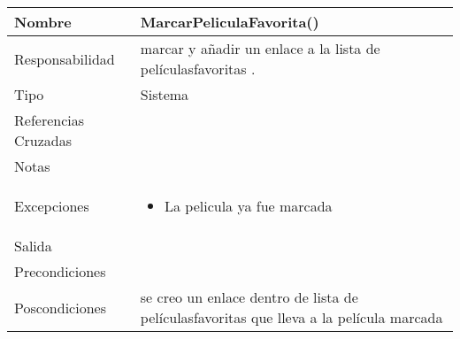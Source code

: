 \documentclass{article}
\begin{document}
\begin{table}[h]
\begin{tabular}{|l|l|l|l|l|l|}
\hline
\multicolumn{2}{|p{3cm}|}{Nombre} & \multicolumn{4}{p{10cm}|}{\textbf{MarcarPeliculaFavorita()}}\\
\hline
\multicolumn{2}{|p{3cm}|}{Responsabilidad} & \multicolumn{4}{p{10cm}|}{marcar y añadir un enlace a la lista de películasfavoritas .} \\
\hline
\multicolumn{2}{|p{3cm}|}{Tipo} & \multicolumn{4}{p{10cm}|}{Sistema} \\
\hline
\multicolumn{2}{|p{3cm}|}{Referencias Cruzadas} & \multicolumn{4}{p{10cm}|}{} \\
\hline
\multicolumn{2}{|p{3cm}|}{Notas} & \multicolumn{4}{p{10cm}|}{} \\
\hline
\multicolumn{2}{|p{3cm}|}{Excepciones} & \multicolumn{4}{p{10cm}|}{\begin{itemize}
\item La pelicula ya fue marcada
\end{itemize}} \\
\hline
\multicolumn{2}{|p{3cm}|}{Salida} & \multicolumn{4}{p{10cm}|}{} \\
\hline
\multicolumn{2}{|p{3cm}|}{Precondiciones} & \multicolumn{4}{p{10cm}|}{} \\
\hline
\multicolumn{2}{|p{3cm}|}{Poscondiciones} & \multicolumn{4}{p{10cm}|}{se creo un enlace dentro de lista de películasfavoritas que lleva a la película marcada} \\
\hline
\end{tabular}
\end{table}
\end{document}
